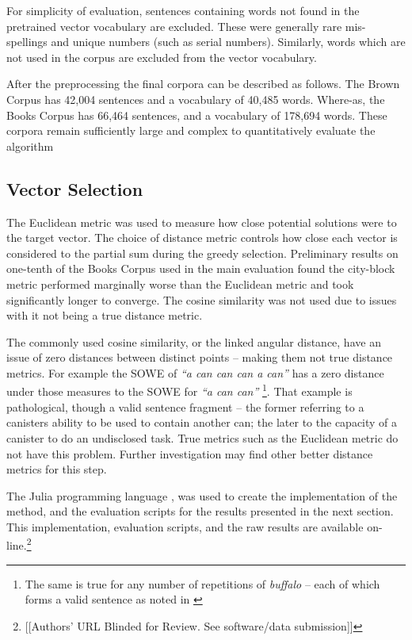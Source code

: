\documentclass{llncs}
\begin{document}
For simplicity of evaluation, sentences containing words not found in the pretrained vector vocabulary are excluded. These were generally rare mis-spellings and unique numbers (such as serial numbers). Similarly, words which are not used in the corpus are excluded from the vector vocabulary. 

After the preprocessing the final corpora can be described as follows. The Brown Corpus has 42,004 sentences and a vocabulary of 40,485 words. Where-as, the Books Corpus has 66,464 sentences, and a vocabulary of 178,694 words. These corpora remain sufficiently large and complex to quantitatively evaluate the algorithm

\subsection{Vector Selection}
The Euclidean metric was used to measure how close potential solutions were to the target vector. The choice of distance metric controls how close each vector is considered to the partial sum during the greedy selection. Preliminary results on one-tenth of the Books Corpus used in the main evaluation found the city-block metric performed marginally worse than the Euclidean metric and took significantly longer to converge. The cosine similarity was not used due to issues with it not being a true distance metric.

The commonly used cosine similarity, or the linked angular distance, have an issue of zero distances between distinct points -- making them not true distance metrics. For example the SOWE of \emph{``a can can can a can''} has a zero distance under those measures to the SOWE for \emph{``a can can''} \footnote{The same is true for any number of repetitions of \emph{buffalo} -- each of which forms a valid sentence as noted in \textcite{tymoczko1995sweet}}. That example is pathological, though a valid sentence fragment  -- the former referring to a canisters ability to be used to contain another can; the later to the capacity of a canister to do an undisclosed task. True metrics such as the Euclidean metric do not have this problem. Further investigation may find other better distance metrics for this step. 


The Julia programming language \parencite{Julia}, was used to create the implementation of the method, and the evaluation scripts for the results presented in the next section. This implementation, evaluation scripts, and the raw results are available on-line.\footnote{[[Authors' URL Blinded for Review. See software/data submission]]}
\end{document}
